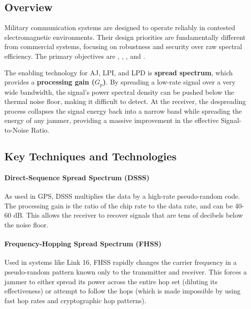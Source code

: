 \subsection{Overview}

Military communication systems are designed to operate reliably in contested electromagnetic environments. Their design priorities are fundamentally different from commercial systems, focusing on robustness and security over raw spectral efficiency. The primary objectives are , , , and .

\begin{keyconcept}
    The enabling technology for AJ, LPI, and LPD is \textbf{spread spectrum}, which provides a \textbf{processing gain ($G_p$)}. By spreading a low-rate signal over a very wide bandwidth, the signal's power spectral density can be pushed below the thermal noise floor, making it difficult to detect. At the receiver, the despreading process collapses the signal energy back into a narrow band while spreading the energy of any jammer, providing a massive improvement in the effective Signal-to-Noise Ratio.
\end{keyconcept}


\subsection{Key Techniques and Technologies}

\paragraph{Direct-Sequence Spread Spectrum (DSSS)}
As used in GPS, DSSS multiplies the data by a high-rate pseudo-random code. The processing gain is the ratio of the chip rate to the data rate, and can be 40-60 dB. This allows the receiver to recover signals that are tens of decibels below the noise floor.

\paragraph{Frequency-Hopping Spread Spectrum (FHSS)}
Used in systems like Link 16, FHSS rapidly changes the carrier frequency in a pseudo-random pattern known only to the transmitter and receiver. This forces a jammer to either spread its power across the entire hop set (diluting its effectiveness) or attempt to follow the hops (which is made impossible by using fast hop rates and cryptographic hop patterns).

